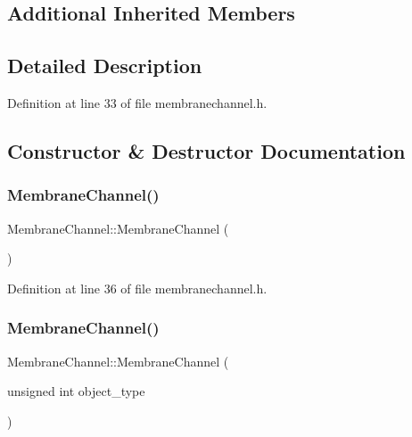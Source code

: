 \subsection*{Additional Inherited Members}


\subsection{Detailed Description}


Definition at line 33 of file membranechannel.\+h.



\subsection{Constructor \& Destructor Documentation}
\mbox{\label{class_membrane_channel_acbc07cd5836394396b0c1944f43350d6}} 
\subsubsection{\texorpdfstring{Membrane\+Channel()}{MembraneChannel()}\hspace{0.1cm}{\footnotesize\ttfamily [1/4]}}
{\footnotesize\ttfamily Membrane\+Channel\+::\+Membrane\+Channel (\begin{DoxyParamCaption}{ }\end{DoxyParamCaption})\hspace{0.3cm}{\ttfamily [inline]}}



Definition at line 36 of file membranechannel.\+h.

\mbox{\label{class_membrane_channel_a17cdd2064bebb7bd2568cf5ec92715fc}} 
\subsubsection{\texorpdfstring{Membrane\+Channel()}{MembraneChannel()}\hspace{0.1cm}{\footnotesize\ttfamily [2/4]}}
{\footnotesize\ttfamily Membrane\+Channel\+::\+Membrane\+Channel (\begin{DoxyParamCaption}\item[{unsigned int}]{object\+\_\+type }\end{DoxyParamCaption})\hspace{0.3cm}{\ttfamily [inline]}}



